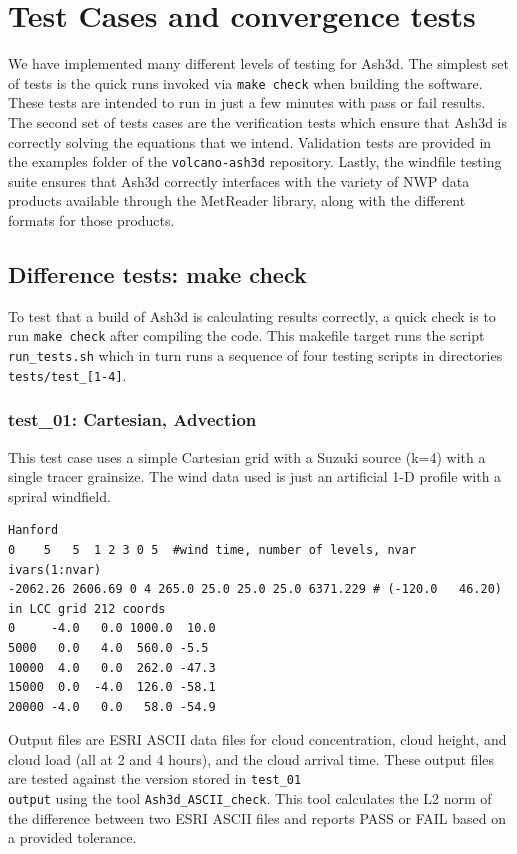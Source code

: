 \chapter{Test Cases and convergence tests}\label{ChapAppendTestCases}

We have implemented many different levels of testing for Ash3d. The simplest
set of tests is the quick runs invoked via \texttt{make check} when building
the software. These tests are intended to run in just a few minutes with
pass or fail results. The second set of tests cases are the verification tests
which ensure that Ash3d is correctly solving the equations that we intend.
Validation tests are provided in the examples folder of the \texttt{volcano-ash3d}
repository. Lastly, the windfile testing suite ensures that Ash3d correctly
interfaces with the variety of NWP data products available through the MetReader
library, along with the different formats for those products.

\section{Difference tests: make check}\label{ChapAppendTestCasesCheck}
To test that a build of Ash3d is calculating results correctly, a quick check is to
run \texttt{make check} after compiling the code. This makefile target runs
the script \texttt{run\_tests.sh} which in turn runs a sequence of four testing
scripts in directories \texttt{tests/test\_[1-4]}. 
\subsection{test\_01: Cartesian, Advection}
This test case uses a simple Cartesian grid with a Suzuki source (k=4) with
a single tracer grainsize. The wind data used is just an artificial 1-D
profile with a spriral windfield.
\small
\begin{verbatim}
Hanford
0    5   5  1 2 3 0 5  #wind time, number of levels, nvar ivars(1:nvar)
-2062.26 2606.69 0 4 265.0 25.0 25.0 25.0 6371.229 # (-120.0   46.20) in LCC grid 212 coords
0     -4.0   0.0 1000.0  10.0
5000   0.0   4.0  560.0 -5.5
10000  4.0   0.0  262.0 -47.3
15000  0.0  -4.0  126.0 -58.1
20000 -4.0   0.0   58.0 -54.9
\end{verbatim}
\normalsize
Output files are ESRI ASCII data files for cloud concentration, cloud height, and
cloud load (all at 2 and 4 hours), and the cloud arrival time. These output
files are tested against the version stored in \texttt{test\_01\\output}
using the tool \texttt{Ash3d\_ASCII\_check}. This tool calculates the L2 norm
of the difference between two ESRI ASCII files and reports PASS or FAIL based
on a provided tolerance.

